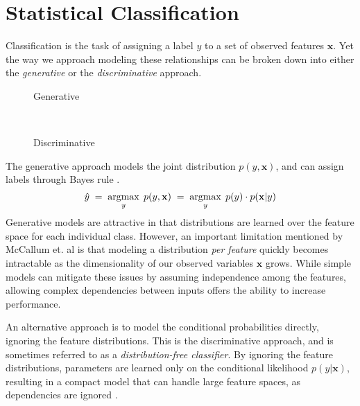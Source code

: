 \documentclass{article}
\DeclareMathOperator*{\argmax}{argmax}
\begin{document}
\section{Statistical Classification}
\label{sec:classification}
Classification is the task of assigning a label $y$ to a set of observed
features $\mathbf{x}$. Yet the way we approach modeling these relationships
can be broken down into either the \textit{generative} or the
\textit{discriminative} approach.

\begin{figure*}[h!]
    \centering
    \begin{subfigure}[t]{0.15\textwidth}
        \centering
        \caption*{Generative}
    \end{subfigure}%
    ~
    \begin{subfigure}[t]{0.15\textwidth}
        \centering
        \caption*{Discriminative}
    \end{subfigure}
\end{figure*}

The generative approach models the joint distribution $p(y, \mathbf{x})$,
and can assign labels through Bayes rule \cite{NgJordan}.
\begin{equation}
    \hat{y} \; = \; \argmax_y \; p(y, \mathbf{x}) \; = \; \argmax_y \; p(y) \cdot p(\mathbf{x} | y) \\
\end{equation}
Generative models are attractive in that distributions are learned over the
feature space for each individual class. However, an important limitation
mentioned by McCallum et. al \cite{McCallumCRF} is that modeling a distribution
\textit{per feature} quickly becomes intractable as the dimensionality of our
observed variables $\mathbf{x}$ grows. While simple models can mitigate
these issues by assuming independence among the features, allowing complex
dependencies between inputs offers the ability to increase performance.

An alternative approach is to model the conditional probabilities directly,
ignoring the feature distributions. This is the discriminative approach,
and is sometimes referred to as a \textit{distribution-free classifier}.
By ignoring the feature distributions, parameters are learned only on the
conditional likelihood $p(y | \mathbf{x})$, resulting in a compact model
that can handle large feature spaces, as dependencies
are ignored \cite{McCallumCRF}.
\end{document}
